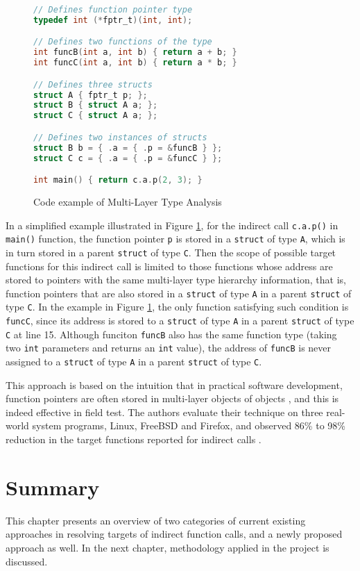 \begin{figure}[hb]
    \centering
    \begin{lstlisting}[language=c]
// Defines function pointer type
typedef int (*fptr_t)(int, int);

// Defines two functions of the type
int funcB(int a, int b) { return a + b; }
int funcC(int a, int b) { return a * b; }

// Defines three structs
struct A { fptr_t p; };
struct B { struct A a; };
struct C { struct A a; };

// Defines two instances of structs
struct B b = { .a = { .p = &funcB } };
struct C c = { .a = { .p = &funcC } };

int main() { return c.a.p(2, 3); }
    \end{lstlisting}
    \caption{Code example of Multi-Layer Type Analysis}
    \label{fig:mlta}
\end{figure}

In a simplified example illustrated in Figure \ref{fig:mlta}, for the indirect call \texttt{c.a.p()} in \texttt{main()} function, the function pointer \texttt{p} is stored in a \texttt{struct} of type \texttt{A}, which is in turn stored in a parent \texttt{struct} of type \texttt{C}. Then the scope of possible target functions for this indirect call is limited to those functions whose address are stored to pointers with the same multi-layer type hierarchy information, that is, function pointers that are also stored in a \texttt{struct} of type \texttt{A} in a parent \texttt{struct} of type \texttt{C}. In the example in Figure \ref{fig:mlta}, the only function satisfying such condition is \texttt{funcC}, since its address is stored to a \texttt{struct} of type \texttt{A} in a parent \texttt{struct} of type \texttt{C} at line 15. Although funciton \texttt{funcB} also has the same function type (taking two \texttt{int} parameters and returns an \texttt{int} value), the address of \texttt{funcB} is never assigned to a \texttt{struct} of type \texttt{A} in a parent \texttt{struct} of type \texttt{C}.

This approach is based on the intuition that in practical software development, function pointers are often stored in multi-layer objects of objects \cite{mlta}, and this is indeed effective in field test. The authors evaluate their technique on three real-world system programs, Linux, FreeBSD and Firefox, and observed 86\% to 98\% reduction in the target functions reported for indirect calls \cite{mlta}.

\section{Summary}
\label{section:previous-work-summary}

This chapter presents an overview of two categories of current existing approaches in resolving targets of indirect function calls, and a newly proposed approach as well. In the next chapter, methodology applied in the project is discussed.